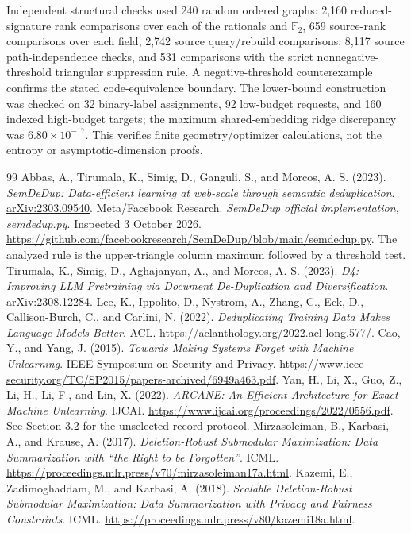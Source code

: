 \documentclass[11pt,a4paper]{article}
\theoremstyle{definition}\newtheorem{definition}[theorem]{Definition}
\begin{document}
Independent structural checks used 240 random ordered graphs: 2,160 reduced-signature rank comparisons over each of the rationals and $\mathbb F_2$, 659 source-rank comparisons over each field, 2,742 source query/rebuild comparisons, 8,117 source path-independence checks, and 531 comparisons with the strict nonnegative-threshold triangular suppression rule. A negative-threshold counterexample confirms the stated code-equivalence boundary. The lower-bound construction was checked on 32 binary-label assignments, 92 low-budget requests, and 160 indexed high-budget targets; the maximum shared-embedding ridge discrepancy was $6.80\times10^{-17}$. This verifies finite geometry/optimizer calculations, not the entropy or asymptotic-dimension proofs.

\begin{thebibliography}{99}\small
{} Abbas, A., Tirumala, K., Simig, D., Ganguli, S., and Morcos, A. S. (2023). \emph{SemDeDup: Data-efficient learning at web-scale through semantic deduplication}. \href{https://arxiv.org/abs/2303.09540}{arXiv:2303.09540}.
 Meta/Facebook Research. \emph{SemDeDup official implementation, semdedup.py}. Inspected 3 October 2026. \url{https://github.com/facebookresearch/SemDeDup/blob/main/semdedup.py}. The analyzed rule is the upper-triangle column maximum followed by a threshold test.
 Tirumala, K., Simig, D., Aghajanyan, A., and Morcos, A. S. (2023). \emph{D4: Improving LLM Pretraining via Document De-Duplication and Diversification}. \href{https://arxiv.org/abs/2308.12284}{arXiv:2308.12284}.
 Lee, K., Ippolito, D., Nystrom, A., Zhang, C., Eck, D., Callison-Burch, C., and Carlini, N. (2022). \emph{Deduplicating Training Data Makes Language Models Better}. ACL. \url{https://aclanthology.org/2022.acl-long.577/}.
 Cao, Y., and Yang, J. (2015). \emph{Towards Making Systems Forget with Machine Unlearning}. IEEE Symposium on Security and Privacy. \url{https://www.ieee-security.org/TC/SP2015/papers-archived/6949a463.pdf}.
 Yan, H., Li, X., Guo, Z., Li, H., Li, F., and Lin, X. (2022). \emph{ARCANE: An Efficient Architecture for Exact Machine Unlearning}. IJCAI. \url{https://www.ijcai.org/proceedings/2022/0556.pdf}. See Section 3.2 for the unselected-record protocol.
 Mirzasoleiman, B., Karbasi, A., and Krause, A. (2017). \emph{Deletion-Robust Submodular Maximization: Data Summarization with ``the Right to be Forgotten''}. ICML. \url{https://proceedings.mlr.press/v70/mirzasoleiman17a.html}.
 Kazemi, E., Zadimoghaddam, M., and Karbasi, A. (2018). \emph{Scalable Deletion-Robust Submodular Maximization: Data Summarization with Privacy and Fairness Constraints}. ICML. \url{https://proceedings.mlr.press/v80/kazemi18a.html}.

\end{thebibliography}
\end{document}
